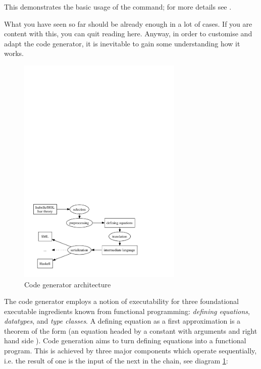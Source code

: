 \begin{isabellebody}
\begin{isamarkuptext}
\noindent This demonstrates the basic usage of the \hyperlink{command.export-code}{\mbox{}} command;
  for more details see .%
\end{isamarkuptext}%
\isamarkuptrue%
%
\isamarkuptrue%
%
\begin{isamarkuptext}%
What you have seen so far should be already enough in a lot of cases.  If you
  are content with this, you can quit reading here.  Anyway, in order to customise
  and adapt the code generator, it is inevitable to gain some understanding
  how it works.

  \begin{figure}[h]
    \centering
    \includegraphics[width=0.7\textwidth]{codegen_process}
    \caption{Code generator architecture}
    \label{fig:arch}
  \end{figure}

  The code generator employs a notion of executability
  for three foundational executable ingredients known
  from functional programming:
  \emph{defining equations}, \emph{datatypes}, and
  \emph{type classes}.  A defining equation as a first approximation
  is a theorem of the form 
  (an equation headed by a constant  with arguments
   and right hand side ).
  Code generation aims to turn defining equations
  into a functional program.  This is achieved by three major
  components which operate sequentially, i.e. the result of one is
  the input
  of the next in the chain,  see diagram \ref{fig:arch}:


\end{isamarkuptext}
\end{isabellebody}
